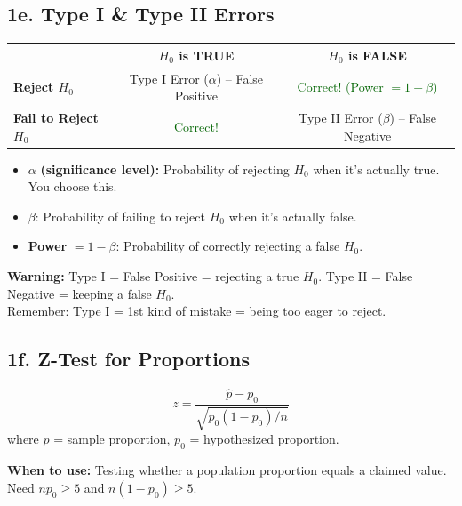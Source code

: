 \documentclass[11pt, letterpaper]{article}
\newcommand{\warn}[1]{\begin{warningbox}\textbf{Warning:} #1\end{warningbox}}
\begin{document}
\subsection{1e. Type I \& Type II Errors}

\begin{center}
\begin{tabular}{l|c|c}
\toprule
 & \textbf{$H_0$ is TRUE} & \textbf{$H_0$ is FALSE} \\
\midrule
\textbf{Reject $H_0$} & \textcolor{warningred}{Type I Error ($\alpha$) -- False Positive} & \textcolor{darkgreen}{Correct! (Power $= 1-\beta$)} \\
\textbf{Fail to Reject $H_0$} & \textcolor{darkgreen}{Correct!} & \textcolor{warningred}{Type II Error ($\beta$) -- False Negative} \\
\bottomrule
\end{tabular}
\end{center}

\begin{itemize}[nosep]
  \item $\alpha$ \textbf{(significance level):} Probability of rejecting $H_0$ when it's actually true. You choose this.
  \item $\beta$: Probability of failing to reject $H_0$ when it's actually false.
  \item \textbf{Power} $= 1 - \beta$: Probability of correctly rejecting a false $H_0$.
\end{itemize}

\warn{Type I = False Positive = rejecting a true $H_0$. \quad Type II = False Negative = keeping a false $H_0$. \\ Remember: Type I = 1st kind of mistake = being too eager to reject.}

\subsection{1f. Z-Test for Proportions}

\begin{formulabox}
\[ z = \frac{\hat{p} - p_0}{\sqrt{p_0(1 - p_0) / n}} \]
where $\hat{p}$ = sample proportion, $p_0$ = hypothesized proportion.

\medskip
\textbf{When to use:} Testing whether a population proportion equals a claimed value. Need $np_0 \geq 5$ and $n(1-p_0) \geq 5$.
\end{formulabox}
\end{document}
